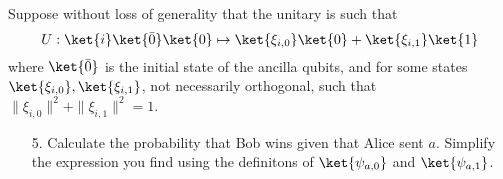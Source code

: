 \begin{exercises}
Suppose without loss of generality that the unitary is such that
\begin{equation}
U:  \ket{i} \ket{\bar{0}} \ket{0} \mapsto  \ket{\xi_{i,0}} \ket{0} + \ket{\xi_{i,1}} \ket{1}
\end{equation}
where $\ket{\bar{0}}$ is the initial state of the ancilla qubits, and for some states $\ket{\xi_{i,0}}, \ket{\xi_{i,1}}$, not necessarily orthogonal, such that $\|\xi_{i,0}\|^2+ \|\xi_{i,1}\|^2 = 1$.
\begin{enumerate}
\item[5.] Calculate the probability that Bob wins given that Alice sent $a$. Simplify the expression you find using the definitons of $\ket{\psi_{a,0}}$ and $\ket{\psi_{a,1}}$.

\end{enumerate}
\end{exercises}
